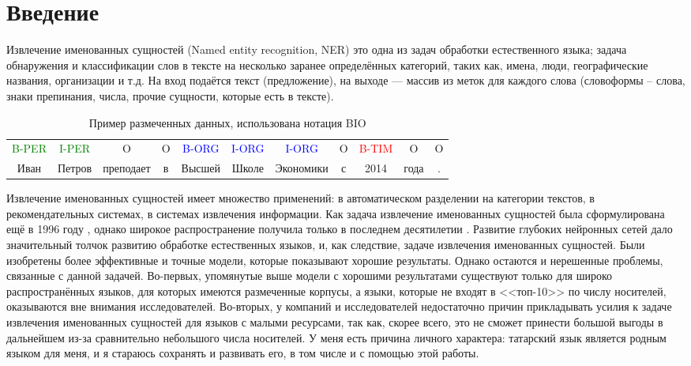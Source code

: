\section{Введение}

Извлечение именованных сущностей (Named entity recognition, NER) это одна из задач обработки естественного языка; задача обнаружения и классификации слов в тексте на несколько заранее определённых категорий, таких как, имена, люди, географические названия, организации и т.д. На вход подаётся текст (предложение), на выходе --- массив из меток для каждого слова (словоформы -- слова, знаки препинания, числа, прочие сущности, которые есть в тексте).

\begin{table}[h]
\begin{tabular}[h]{ccccccccccc}
\textcolor{green}{B-PER} & \textcolor{green}{I-PER} & O & O & \textcolor{blue}{B-ORG} &  \textcolor{blue}{I-ORG} &  \textcolor{blue}{I-ORG} & O & \textcolor{red}{B-TIM} & O & O \\
Иван & Петров & преподает & в & Высшей & Школе & Экономики & с & 2014 & года & . \\
\end{tabular}
\caption{Пример размеченных данных, использована нотация BIO}
\end{table}

Извлечение именованных сущностей имеет множество применений: в автоматическом разделении на категории текстов, в рекомендательных системах, в системах извлечения информации. Как задача извлечение именованных сущностей была сформулирована ещё в 1996 году \cite{first_NER}, однако широкое распространение получила только в последнем десятилетии \cite{DBLP:journals/corr/abs-1812-09449}. Развитие глубоких нейронных сетей дало значительный толчок развитию обработке естественных языков, и, как следствие, задаче извлечения именованных сущностей. Были изобретены более эффективные и точные модели, которые показывают хорошие результаты. Однако остаются и нерешенные проблемы, связанные с данной задачей. Во-первых, упомянутые выше модели с хорошими результатами существуют только для широко распространённых языков, для которых имеются размеченные корпусы, а языки, которые не входят в <<топ-10>> по числу носителей, оказываются вне внимания исследователей. Во-вторых, у компаний и исследователей недостаточно причин прикладывать усилия к задаче извлечения именованных сущностей для языков с малыми ресурсами, так как, скорее всего, это не сможет принести большой выгоды в дальнейшем из-за сравнительно небольшого числа носителей. У меня есть причина личного характера: татарский язык является родным языком для меня, и я стараюсь сохранять и развивать его, в том числе и с помощью этой работы.

